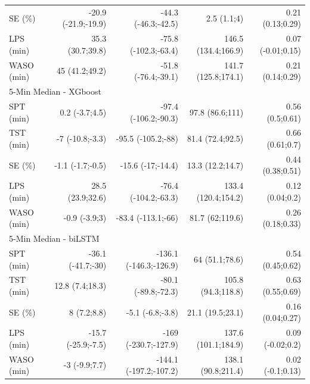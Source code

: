 \documentclass[
  super,
  preprint,
  3p]{elsarticle}
\begin{document}
\begin{longtable}{lrrrr}
SE (\%) & -20.9 (-21.9;-19.9) & -44.3 (-46.3;-42.5) & 2.5 (1.1;4) & 0.21 (0.13;0.29) \\ 
LPS (min) & 35.3 (30.7;39.8) & -75.8 (-102.3;-63.4) & 146.5 (134.4;166.9) & 0.07 (-0.01;0.15) \\ 
WASO (min) & 45 (41.2;49.2) & -51.8 (-76.4;-39.1) & 141.7 (125.8;174.1) & 0.21 (0.14;0.29) \\ 
\midrule
\multicolumn{5}{l}{5-Min Median - XGboost} \\ 
\midrule
SPT (min) & 0.2 (-3.7;4.5) & -97.4 (-106.2;-90.3) & 97.8 (86.6;111) & 0.56 (0.5;0.61) \\ 
TST (min) & -7 (-10.8;-3.3) & -95.5 (-105.2;-88) & 81.4 (72.4;92.5) & 0.66 (0.61;0.7) \\ 
SE (\%) & -1.1 (-1.7;-0.5) & -15.6 (-17;-14.4) & 13.3 (12.2;14.7) & 0.44 (0.38;0.51) \\ 
LPS (min) & 28.5 (23.9;32.6) & -76.4 (-104.2;-63.3) & 133.4 (120.4;154.2) & 0.12 (0.04;0.2) \\ 
WASO (min) & -0.9 (-3.9;3) & -83.4 (-113.1;-66) & 81.7 (62;119.6) & 0.26 (0.18;0.33) \\ 
\midrule
\multicolumn{5}{l}{5-Min Median - biLSTM} \\ 
\midrule
SPT (min) & -36.1 (-41.7;-30) & -136.1 (-146.3;-126.9) & 64 (51.1;78.6) & 0.54 (0.45;0.62) \\ 
TST (min) & 12.8 (7.4;18.3) & -80.1 (-89.8;-72.3) & 105.8 (94.3;118.8) & 0.63 (0.55;0.69) \\ 
SE (\%) & 8 (7.2;8.8) & -5.1 (-6.8;-3.8) & 21.1 (19.5;23.1) & 0.16 (0.04;0.27) \\ 
LPS (min) & -15.7 (-25.9;-7.5) & -169 (-230.7;-127.9) & 137.6 (101.1;184.9) & 0.09 (-0.02;0.2) \\ 
WASO (min) & -3 (-9.9;7.7) & -144.1 (-197.2;-107.2) & 138.1 (90.8;211.4) & 0.02 (-0.1;0.13) \\ 
\bottomrule
\end{longtable}
\end{document}
